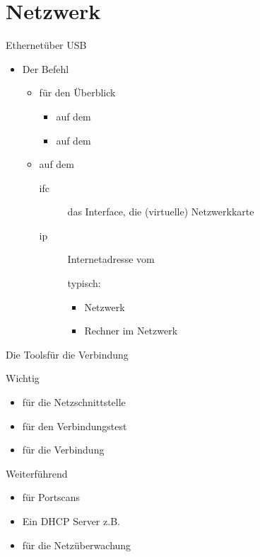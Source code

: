 \section{Netzwerk}
\begin{frame}{Ethernet}{über USB}
 \begin{itemize}
  \item Der Befehl 
  \begin{itemize}
   \item {} für den Überblick
   \begin{itemize}
    \item auf dem \target 
	\item auf dem \host
   \end{itemize}
   \item {} auf dem \host
   \begin{description}
    \item[ifc] das Interface, die (virtuelle) Netzwerkkarte
	\item[ip] Internetadresse vom \host
	
	typisch: 
	\begin{itemize}
	 \item Netzwerk 
	 \item Rechner im Netzwerk 
	\end{itemize}
   \end{description}
  \end{itemize}
 \end{itemize}
\end{frame}

\begin{frame}{Die Tools}{für die Verbindung}
\begin{block}{Wichtig}
 \begin{itemize}
  \item {} für die Netzschnittstelle
  \item {} für den Verbindungstest
  \item {} für die Verbindung
 \end{itemize}
 \end{block}
 \begin{block}{Weiterführend}
 \begin{itemize}
  \item {} für Portscans
  \item Ein DHCP Server z.B. 
  \item {} für die Netzüberwachung
 \end{itemize}
 \end{block}
\end{frame}


